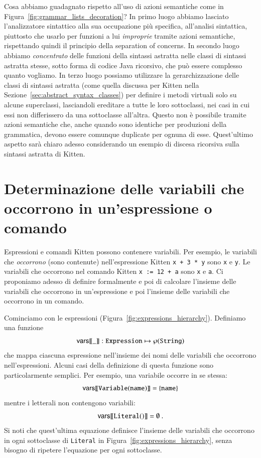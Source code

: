 Cosa abbiamo guadagnato rispetto all'uso di azioni semantiche come
in Figura~\ref{fig:grammar_lists_decoration}? In primo luogo abbiamo lasciato
l'analizzatore sintattico alla sua occupazione pi\`u specifica, \cioe
all'analisi sintattica, piuttosto che usarlo per funzioni a lui \emph{improprie}
tramite azioni semantiche, rispettando quindi il principio della separation
of concerns. In secondo luogo abbiamo \emph{concentrato}
delle funzioni della sintassi astratta nelle classi di sintassi astratta
stesse, sotto forma di codice Java ricorsivo, che pu\`o essere complesso
quanto vogliamo. In terzo luogo possiamo utilizzare la gerarchizzazione delle
classi di sintassi astratta (come quella discussa per Kitten nella
Sezione~\ref{sec:abstract_syntax_classes}) per definire i metodi virtuali
solo su alcune superclassi, lasciandoli ereditare a tutte le loro sottoclassi,
nei casi in cui essi non differissero da una sottoclasse all'altra.
Questo non \`e possibile tramite azioni semantiche che, anche quando sono
identiche per \piu produzioni della grammatica,
devono essere comunque duplicate per ognuna di esse.
Quest'ultimo aspetto sar\`a chiaro adesso considerando un esempio di
discesa ricorsiva sulla sintassi astratta di Kitten.
%
\section{Determinazione delle variabili che occorrono in un'espressione o comando}
  \label{sec:free_variables}
%
Espressioni e comandi Kitten possono contenere variabili.
Per esempio, le variabili che \emph{occorrono} (sono contenute)
nell'espressione Kitten \texttt{x + 3 * y} sono \texttt{x} e \texttt{y}.
Le variabili che occorrono nel comando Kitten
\texttt{x := 12 + a} sono \texttt{x} e \texttt{a}.
Ci proponiamo adesso di definire formalmente e poi di calcolare l'insieme delle
variabili che occorrono in un'espressione e poi l'insieme delle variabili che
occorrono in un comando.

Cominciamo con le espressioni (Figura~\ref{fig:expressions_hierarchy}).
Definiamo una funzione
\[
  {\mathsf{vars}[\![{\_}]\!]}:\mathtt{Expression}\mapsto\wp(\mathtt{String})
\]
che mappa ciascuna espressione nell'insieme dei nomi delle variabili
che occorrono nell'espressioni. Alcuni casi della
definizione di questa funzione sono particolarmente semplici. Per esempio,
una variabile occorre in se stessa:
\begin{equation}\label{eq:vars_variable}
  {\mathsf{vars}[\![{\mathtt{Variable(name)}}]\!]}=\{\mathtt{name}\}
\end{equation}
mentre i letterali non contengono variabili:
\begin{equation}\label{eq:vars_literal}
  {\mathsf{vars}[\![{\mathtt{Literal()}}]\!]}=\emptyset~.
\end{equation}
Si noti che quest'ultima equazione definisce l'insieme delle variabili che
occorrono in ogni sottoclasse di \texttt{Literal} in
Figura~\ref{fig:expressions_hierarchy}, senza bisogno di ripetere l'equazione
per ogni sottoclasse.


